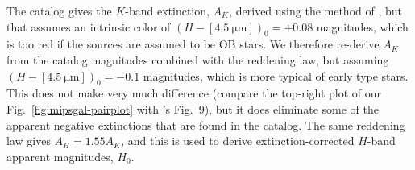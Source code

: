 The catalog gives the \(K\)-band extinction, \(A_K\), derived using
the method of \citet{Majewski:2011a}, but that assumes an intrinsic
color of \((H - [\SI{4.5}{\um}])_0 = +0.08\) magnitudes, which is too
red if the sources are assumed to be OB stars.  We therefore re-derive
\(A_K\) from the catalog magnitudes combined with the
\citet{Indebetouw:2005a} reddening law, but assuming
\((H - [\SI{4.5}{\um}])_0 = -0.1\) magnitudes, which is more typical
of early type stars.  This does not make very much difference (compare
the top-right plot of our Fig.~\ref{fig:mipsgal-pairplot} with
\citeauthor{Kobulnicky:2016a}'s Fig.~9), but it does eliminate some of
the apparent negative extinctions that are found in the catalog.  The
same reddening law gives \(A_H = 1.55 A_K\), and this is used to
derive extinction-corrected \(H\)-band apparent magnitudes, \(H_0\).

